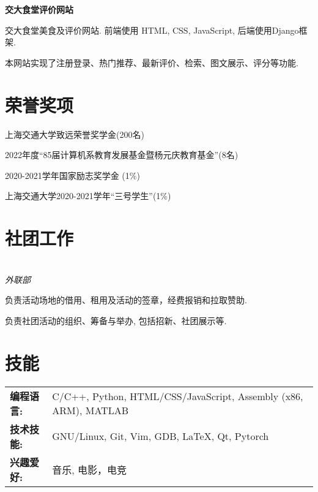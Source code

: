 \documentclass{cv_cn}
\begin{document}
\textbf{交大食堂评价网站}\enskip \underline{\href{https://github.com/WxxW2002/SJTU-canteen}{\faGithub}}
\begin{zitemize}
  \item 交大食堂美食及评价网站. 前端使用 HTML, CSS, JavaScript, 后端使用Django框架.
  \item 本网站实现了注册登录、热门推荐、最新评价、检索、图文展示、评分等功能.
\end{zitemize}

\section{荣誉奖项}
\begin{zitemize}
  \item 上海交通大学致远荣誉奖学金(200名)
  \item 2022年度“85届计算机系教育发展基金暨杨元庆教育基金”(8名)
  \item 2020-2021学年国家励志奖学金 (1\%)
  \item 上海交通大学2020-2021学年“三号学生”(1\%)
\end{zitemize}

\section{社团工作}
\\
\textit{外联部} 
\begin{zitemize}
  \item 负责活动场地的借用、租用及活动的签章，经费报销和拉取赞助.
  \item 负责社团活动的组织、筹备与举办, 包括招新、社团展示等.
\end{zitemize}

\section{技能}
\begin{tabular}[t]{ll}
  \textbf{编程语言:} & C/C++, Python, HTML/CSS/JavaScript, Assembly (x86, ARM), MATLAB\\
  \textbf{技术技能:} & GNU/Linux, Git, Vim, GDB, \LaTeX, Qt,  Pytorch\\
  \textbf{兴趣爱好:} & 音乐, 电影，电竞 
\end{tabular}
\end{document}
